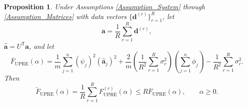 \documentclass[12pt]{article}
\newcommand{\mA}{m}	%
\newcommand{\aVec}{\mathbf{a}}	%
\newcommand{\dVec}{\mathbf{d}}	%
\newcommand{\trans}[1]{{#1}^\mathsf{T}}	%
\newcommand{\dft}[1]{\widehat{#1}}	%
\newcommand{\regparam}{\alpha}  %
\newcommand{\filt}{\phi}
\newcommand{\mfilt}{\psi}
\newcommand{\noiseSD}{\sigma}	%
\newcommand{\U}{F_{\text{UPRE}}}	%
\newcommand{\UBig}{\widetilde{F}_{\text{UPRE}}}	%
\newcommand{\UAvg}{\overline{F}_{\text{UPRE}}}	%
\newtheorem{proposition}{Proposition}[section]
\begin{document}
\begin{proposition}
Under Assumptions \ref{Assumption_System} through \ref{Assumption_Matrices} with data vectors $\{\dVec^{(r)}\}_{r=1}^R$, let 
\begin{equation}
\label{eq:Averaged data}
\aVec = \frac{1}{R}\sum_{r=1}^R \dVec^{(r)},
\end{equation}
$\dft{\aVec} = \trans{U}\aVec$, and let
\begin{equation}
\label{eq:UPRE of Average}
\UAvg(\regparam) = \frac{1}{\mA}\sum_{j=1}^{n} \left(\mfilt_j\right)^2\left(\dft{\aVec}_j\right)^2 + \frac{2}{\mA} \left(\frac{1}{R^2} \sum_{r=1}^R \noiseSD_r^2\right) \left(\sum_{j=1}^{n} \filt_j\right) - \frac{1}{R^2} \sum_{r=1}^R\noiseSD_r^2.
\end{equation}
Then
\begin{equation}
\label{eq:UPRE Bound}
\UBig(\regparam) = \frac{1}{R} \sum_{r=1}^R \U^{(r)}(\regparam) \leq R \UAvg(\regparam), \qquad \regparam \geq 0.
\end{equation}
\end{proposition}
\end{document}
